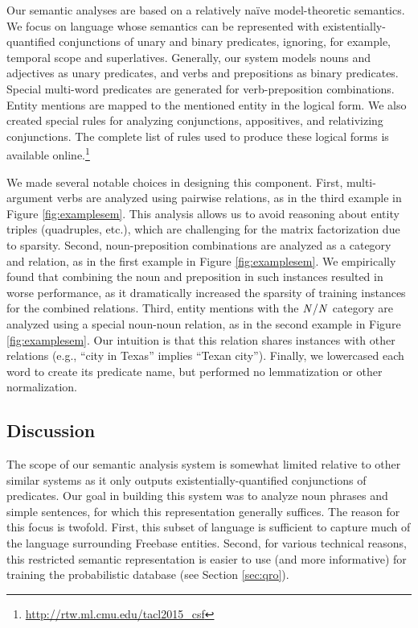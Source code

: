 \documentclass[11pt]{article}
\newcommand{\ccgsyn}[1]{\mbox{$\it{#1}$}}
\begin{document}
Our semantic analyses are based on a relatively na\"ive
model-theoretic semantics. We focus on language whose semantics can be
represented with existentially-quantified conjunctions of unary and
binary predicates, ignoring, for example, temporal scope and
superlatives. Generally, our system models nouns and adjectives as
unary predicates, and verbs and prepositions as binary
predicates. Special multi-word predicates are generated for
verb-preposition combinations. Entity mentions are mapped to the
mentioned entity in the logical form. We also created special rules
for analyzing conjunctions, appositives, and relativizing
conjunctions. The complete list of rules used to produce these logical
forms is available
online.\footnote{\url{http://rtw.ml.cmu.edu/tacl2015_csf}}

We made several notable choices in designing this component. First,
multi-argument verbs are analyzed using pairwise relations, as in the
third example in Figure \ref{fig:examplesem}. This analysis allows us
to avoid reasoning about entity triples (quadruples, etc.), which are
challenging for the matrix factorization due to sparsity. Second,
noun-preposition combinations are analyzed as a category and relation,
as in the first example in Figure \ref{fig:examplesem}. We empirically
found that combining the noun and preposition in such instances
resulted in worse performance, as it dramatically increased the
sparsity of training instances for the combined relations.
Third, entity mentions with the $\ccgsyn{N/N}$ category are analyzed
using a special noun-noun relation, as in the second example in Figure
\ref{fig:examplesem}. Our intuition is that this relation shares
instances with other relations (e.g., ``city in Texas'' implies
``Texan city''). Finally, we lowercased each word to create its
predicate name, but performed no lemmatization or other normalization.

\subsection{Discussion}

The scope of our semantic analysis system is somewhat limited relative
to other similar systems \cite{bos2008,lewis2013} as it only outputs
existentially-quantified conjunctions of predicates. Our goal in
building this system was to analyze noun phrases and simple sentences,
for which this representation generally suffices. The reason for this
focus is twofold. First, this subset of language is sufficient to
capture much of the language surrounding Freebase entities. Second,
for various technical reasons, this restricted semantic representation
is easier to use (and more informative) for training the probabilistic
database (see Section \ref{sec:qro}).
\end{document}
